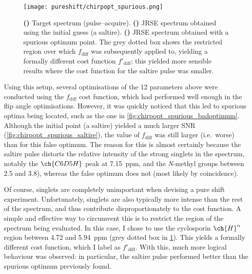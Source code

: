\begin{figure}[htbp]
    \centering
    \texttt{[image: pureshift/chirpopt\_spurious.png]}%
    {\label{fig:chirpopt_spurious_target}}%
    {\label{fig:chirpopt_spurious_saltire}}%
    {\label{fig:chirpopt_spurious_badoptimum}}%
    \caption[Spurious optimum obtained in waveform optimisation using $f_\text{diff}$]{
        \textbf{()} Target spectrum (pulse--acquire).
        \textbf{()} JRSE spectrum obtained using the initial guess (a saltire).
        \textbf{()} JRSE spectrum obtained with a spurious optimum point.
        The grey dotted box shows the restricted region over which $f_\text{diff}$ was subsequently applied to, yielding a formally different cost function $f'_\text{diff}$; this yielded more sensible results where the cost function for the saltire pulse was smaller.
    }
    \label{fig:chirpopt_spurious}
\end{figure}

Using this setup, several optimisations of the 12 parameters above were conducted using the $f_\text{diff}$ cost function, which had performed well enough in the flip angle optimisations.
However, it was quickly noticed that this led to spurious optima being located, such as the one in \cref{fig:chirpopt_spurious_badoptimum}.
Although the initial point (a saltire) yielded a much larger SNR (\cref{fig:chirpopt_spurious_saltire}), the value of $f_\text{diff}$ was still larger (i.e.\ worse) than for this false optimum.
The reason for this is almost certainly because the saltire pulse distorts the relative intensity of the strong singlets in the spectrum, notably the $\ch{C6D5H}$ peak at \SI{7.15}{ppm}, and the \textit{N}-methyl groups between 2.5 and \SI{3.8}{\ppm}), whereas the false optimum does not (most likely by coincidence).

Of course, singlets are completely unimportant when devising a pure shift experiment.
Unfortunately, singlets are also typically more intense than the rest of the spectrum, and thus contribute disproportionately to the cost function.
A simple and effective way to circumvent this is to restrict the region of the spectrum being evaluated.
In this case, I chose to use the cyclosporin $\ch{H}^{\alpha}$ region between 4.72 and \SI{5.94}{ppm} (grey dotted box in \cref{fig:chirpopt_spurious}).
This yields a formally different cost function, which I label as $f'_\text{diff}$.
With this, much more logical behaviour was observed: in particular, the saltire pulse performed better than the spurious optimum previously found.

